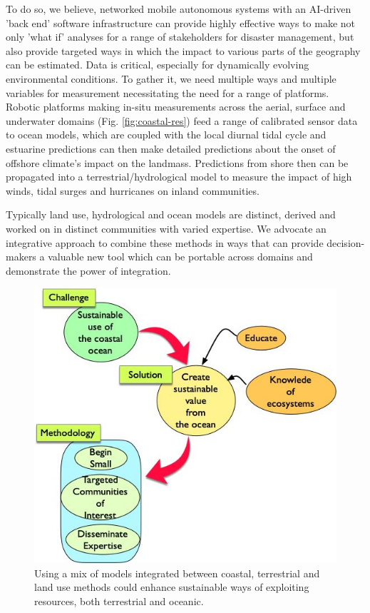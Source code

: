 To do so, we believe, networked mobile autonomous systems with an
AI-driven 'back end' software infrastructure can provide highly
effective ways to make not only 'what if' analyses for a range of
stakeholders for disaster management, but also provide targeted ways
in which the impact to various parts of the geography can be
estimated. Data is critical, especially for dynamically evolving
environmental conditions. To gather it, we need multiple ways and
multiple variables for measurement necessitating the need for a range
of platforms. Robotic platforms making in-situ measurements across the
aerial, surface and underwater domains (Fig. \ref{fig:coastal-res})
feed a range of calibrated sensor data to ocean models, which are
coupled with the local diurnal tidal cycle and estuarine predictions
can then make detailed predictions about the onset of offshore
climate's impact on the landmass. Predictions from shore then can be
propagated into a terrestrial/hydrological model to measure the impact
of high winds, tidal surges and hurricanes on inland communities.


Typically land use, hydrological and ocean models are distinct,
derived and worked on in distinct communities with varied expertise.
We advocate an integrative approach to combine these methods in ways
that can provide decision-makers a valuable new tool which can be
portable across domains and demonstrate the power of integration.



\begin{figure}
  \centering
  \includegraphics[scale=0.40]{fig/Ericeira-method.jpg}
  \caption{Using a mix of models integrated between coastal, terrestrial
    and land use methods could enhance sustainable ways of exploiting
    resources, both terrestrial and oceanic.}
  \label{fig:method}
\end{figure}

